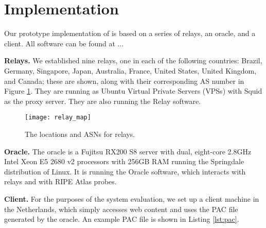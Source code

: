\section{Implementation}
Our prototype implementation of \system{} is based on a series of relays, an oracle, and 
a client. All \system{} software can be found at ... 

{\bf Relays.}  We established nine relays, one in each of the following countries: Brazil, 
Germany, Singapore, Japan, Australia, France, United States, United Kingdom, and Canada; these 
are shown, along with their corresponding AS number in Figure \ref{fig:relay_locations}.  
They are running as Ubuntu Virtual Private Servers (VPSs) with 
Squid as the proxy server.  They are also running the \system{} Relay software.

\begin{figure}[b!]
\centering
\texttt{[image: relay\_map]}
\caption{The locations and ASNs for \system relays.}
\label{fig:relay_locations}
\end{figure}

{\bf Oracle.}  The oracle is a Fujitsu RX200 S8 server with dual, 
eight-core 2.8GHz Intel Xeon E5 2680 v2 processors with 256GB RAM running the 
Springdale distribution of Linux. It is running the \system{} Oracle software, 
which interacts with relays and with RIPE Atlas probes.

{\bf Client.} For the purposes of the system evaluation, we set up a client 
machine in the Netherlands, which simply accesses web content and uses the PAC 
file generated by the oracle.  An example PAC file is shown in Listing \ref{lst:pac}.


